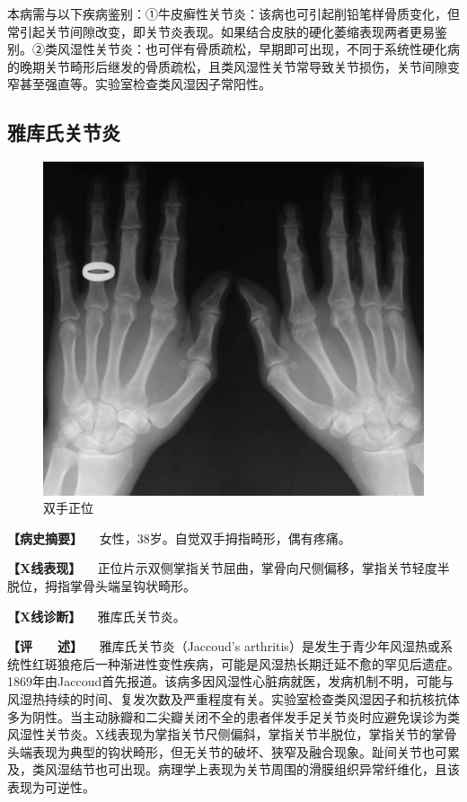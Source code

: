 本病需与以下疾病鉴别：①牛皮癣性关节炎：该病也可引起削铅笔样骨质变化，但常引起关节间隙改变，即关节炎表现。如果结合皮肤的硬化萎缩表现两者更易鉴别。②类风湿性关节炎：也可伴有骨质疏松，早期即可出现，不同于系统性硬化病的晚期关节畸形后继发的骨质疏松，且类风湿性关节常导致关节损伤，关节间隙变窄甚至强直等。实验室检查类风湿因子常阳性。

\subsection{雅库氏关节炎}

\begin{figure}[!htbp]
 \centering
 \includegraphics{./images/Image00121.jpg}
 \captionsetup{justification=centering}
 \caption{双手正位}
 \label{fig2-8-7}
  \end{figure} 

\textbf{【病史摘要】} 　女性，38岁。自觉双手拇指畸形，偶有疼痛。

\textbf{【X线表现】}
　正位片示双侧掌指关节屈曲，掌骨向尺侧偏移，掌指关节轻度半脱位，拇指掌骨头端呈钩状畸形。

\textbf{【X线诊断】} 　雅库氏关节炎。

\textbf{【评　　述】} 　雅库氏关节炎（Jaccoud's
arthritis）是发生于青少年风湿热或系统性红斑狼疮后一种渐进性变性疾病，可能是风湿热长期迁延不愈的罕见后遗症。1869年由Jaccoud首先报道。该病多因风湿性心脏病就医，发病机制不明，可能与风湿热持续的时间、复发次数及严重程度有关。实验室检查类风湿因子和抗核抗体多为阴性。当主动脉瓣和二尖瓣关闭不全的患者伴发手足关节炎时应避免误诊为类风湿性关节炎。X线表现为掌指关节尺侧偏斜，掌指关节半脱位，掌指关节的掌骨头端表现为典型的钩状畸形，但无关节的破坏、狭窄及融合现象。趾间关节也可累及，类风湿结节也可出现。病理学上表现为关节周围的滑膜组织异常纤维化，且该表现为可逆性。


